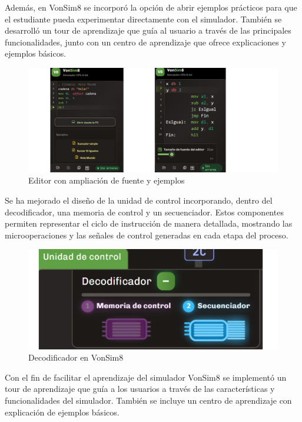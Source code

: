 \documentclass[12pt,oneside]{templates/unerthesis}
\begin{document}
Además, en VonSim8 se incorporó la opción de abrir ejemplos prácticos para que el estudiante pueda experimentar directamente con el simulador. También se desarrolló un tour de aprendizaje que guía al usuario a través de las principales funcionalidades, junto con un centro de aprendizaje que ofrece explicaciones y ejemplos básicos.

\begin{figure}

{\centering \includegraphics[width=1\linewidth]{images/editorfuenteejemplo} 

}

\caption{Editor con ampliación de fuente y ejemplos}\label{fig:editorvonsim}
\end{figure}

Se ha mejorado el diseño de la unidad de control incorporando, dentro del decodificador, una memoria de control y un secuenciador. Estos componentes permiten representar el ciclo de instrucción de manera detallada, mostrando las microoperaciones y las señales de control generadas en cada etapa del proceso.

\begin{figure}

{\centering \includegraphics[width=0.5\linewidth]{images/decodificador} 

}

\caption{Decodificador en VonSim8}\label{fig:decodificador}
\end{figure}

Con el fin de facilitar el aprendizaje del simulador VonSim8 se implementó un tour de aprendizaje que guía a los usuarios a través de las características y funcionalidades del simulador. También se incluye un centro de aprendizaje con explicación de ejemplos básicos.
\end{document}
